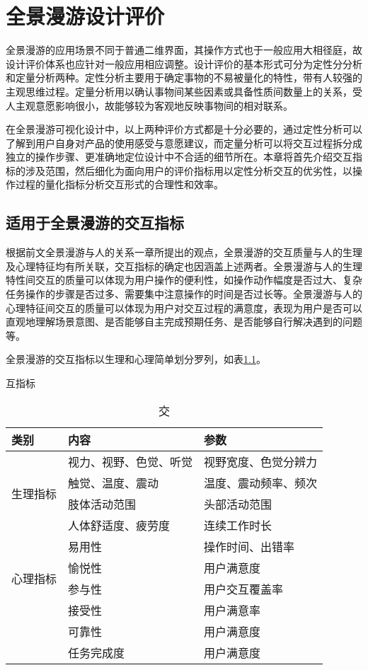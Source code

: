 \chapter{全景漫游设计评价}

全景漫游的应用场景不同于普通二维界面，其操作方式也于一般应用大相径庭，故设计评价体系也应针对一般应用相应调整。设计评价的基本形式可分为定性分分析和定量分析两种。定性分析主要用于确定事物的不易被量化的特性，带有人较强的主观思维过程。定量分析用以确认事物间某些因素或具备性质间数量上的关系，受人主观意愿影响很小，故能够较为客观地反映事物间的相对联系。

在全景漫游可视化设计中，以上两种评价方式都是十分必要的，通过定性分析可以了解到用户自身对产品的使用感受与意愿建议，而定量分析可以将交互过程拆分成独立的操作步骤、更准确地定位设计中不合适的细节所在。本章将首先介绍交互指标的涉及范围，然后细化为面向用户的评价指标用以定性分析交互的优劣性，以操作过程的量化指标分析交互形式的合理性和效率。

\section{适用于全景漫游的交互指标}
根据前文全景漫游与人的关系一章所提出的观点，全景漫游的交互质量与人的生理及心理特征均有所关联，交互指标的确定也因涵盖上述两者。全景漫游与人的生理特性间交互的质量可以体现为用户操作的便利性，如操作动作幅度是否过大、复杂任务操作的步骤是否过多、需要集中注意操作的时间是否过长等。全景漫游与人的心理特征间交互的质量可以体现为用户对交互过程的满意度，表现为用户是否可以直观地理解场景意图、是否能够自主完成预期任务、是否能够自行解决遇到的问题等。

全景漫游的交互指标以生理和心理简单划分罗列，如表\ref{tab:interaction}。

\begin{table}[htp]
\centering
\caption 交互指标
\vskip 5pt
\begin{tabular}{lll}
\toprule
类别 & 内容 & 参数\\
\midrule
\multirow{4}{*}{生理指标} & 视力、视野、色觉、听觉 & 视野宽度、色觉分辨力 	\\
& 触觉、温度、震动 & 温度、震动频率、频次 \\
& 肢体活动范围 & 头部活动范围 \\
& 人体舒适度、疲劳度 & 连续工作时长 \\
\midrule
\multirow{4}{*}{心理指标} & 易用性 & 操作时间、出错率 \\
& 愉悦性 & 用户满意度  \\
& 参与性 & 用户交互覆盖率  \\
& 接受性 & 用户满意率  \\
& 可靠性 & 用户满意度  \\
& 任务完成度 & 用户满意度  \\
\bottomrule
\end{tabular}
\label{tab:interaction}
\end{table}

